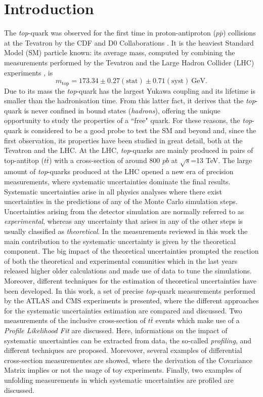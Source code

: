 \documentclass[12pt]{article}
\begin{document}
\section{Introduction}
The \emph{top}-quark was observed for the first time in proton-antiproton ($p\bar{p}$) collisions at the Tevatron by the CDF and D0 Collaborations 
\cite{Abe_1995,Abachi_1995}. It is the heaviest Standard Model (SM) particle known: its average mass, computed by combining the measurements performed by the Tevatron and the Large Hadron Collider (LHC) experiments \cite{atlas2014combination}, is 
\begin{equation}
m_{\mathrm{top}} = 173.34 \pm 0.27(\mathrm{stat}) \pm 0.71(\mathrm{syst})~\mathrm{GeV}.
\end{equation}
Due to its mass the \emph{top}-quark has the largest Yukawa coupling and its lifetime is smaller than the hadronisation time. From this latter fact, it derives that the \emph{top}-quark is never confined in bound states (\emph{hadrons}), offering the unique opportunity to study the properties of a ``free" quark.
For these reasons, the \emph{top}-quark is considered to be a good probe to test the SM and beyond and, since the first observation, its properties have been studied in great detail, both at the Tevatron and the LHC.  
At the LHC, \emph{top}-quarks are mainly produced in pairs of top-antitop ($t\bar{t}$) with a cross-section of around 800 $pb$ at $\sqrt{s}$=13 TeV.
The large amount of \emph{top}-quarks produced at the LHC opened a new era of precision measurements, where systematic uncertainties dominate the final results. Systematic uncertainties arise in all physics analyses where there exist uncertainties in the predictions of any of the Monte Carlo simulation steps. Uncertainties arising from the detector simulation are normally referred to as \emph{experimental}, whereas any uncertainty that arises in any of the other steps is usually classified as \emph{theoretical}. In the measurements reviewed in this work the main contribution to the systematic uncertainty is given by the theoretical component.
The big impact of the theoretical uncertainties prompted the reaction of both the theoretical and experimental comunities which in the last years released higher older calculations and made use of data to tune the simulations.
Moreover, different techniques for the estimation of theoretical uncertainties have been developed. In this work, a set of precise \emph{top}-quark measurements performed by the ATLAS and CMS experiments is presented, where the different approaches for the systematic uncertainties estimation are compared and discussed.
Two measurements of the inclusive cross-section of $t\bar{t}$ events which make use of a \emph{Profile Likelihood Fit} are discussed. Here, informations on the impact of systematic uncertainties can be extracted from data, the so-called \emph{profiling}, and different techniques are proposed. Morevover, several examples of differential cross-section measurementes are showed, where the derivation of the Covariance Matrix implies or not the usage of toy experiments. Finally, two examples of unfolding measurements in which systematic uncertainties are profiled are discussed. 
\end{document}
